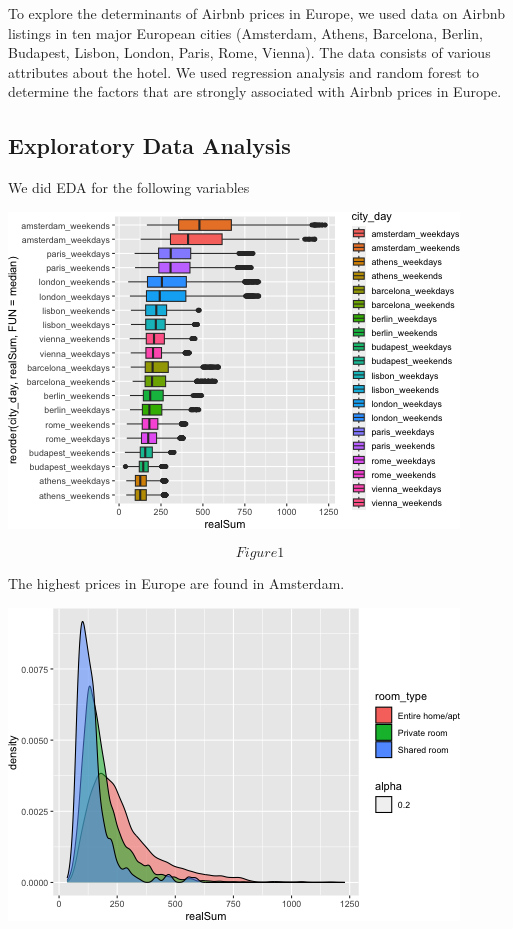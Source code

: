 \documentclass[
]{article}
\begin{document}
To explore the determinants of Airbnb prices in Europe, we used data on
Airbnb listings in ten major European cities (Amsterdam, Athens,
Barcelona, Berlin, Budapest, Lisbon, London, Paris, Rome, Vienna). The
data consists of various attributes about the hotel. We used regression
analysis and random forest to determine the factors that are strongly
associated with Airbnb prices in Europe.

\hypertarget{exploratory-data-analysis}{%
\subsection{Exploratory Data Analysis}\label{exploratory-data-analysis}}

We did EDA for the following variables

\includegraphics{e.png}

\[Figure 1\]

The highest prices in Europe are found in Amsterdam.

\includegraphics{f.png}
\end{document}
